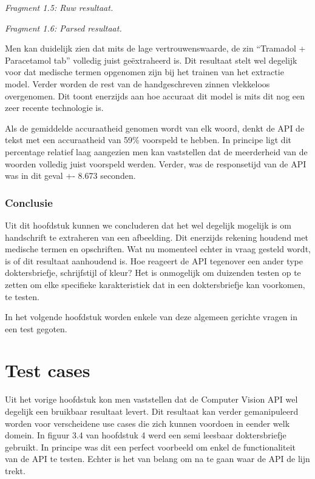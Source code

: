 
\textit{Fragment 1.5: Ruw resultaat.}
\newpage

\textit{Fragment 1.6: Parsed resultaat.}


Men kan duidelijk zien dat mits de lage vertrouwenswaarde, de zin “Tramadol + Paracetamol tab” volledig juist geëxtraheerd is. Dit resultaat stelt wel degelijk voor dat medische termen opgenomen zijn bij het trainen van het extractie model. Verder worden de rest van de handgeschreven zinnen vlekkeloos overgenomen. Dit toont enerzijds aan hoe accuraat dit model is mits dit nog een zeer recente technologie is.  


Als de gemiddelde accuraatheid genomen wordt van elk woord, denkt de API de tekst met een accuraatheid van 59\% voorspeld te hebben. In principe ligt dit percentage relatief laag aangezien men kan vaststellen dat de meerderheid van de woorden volledig juist voorspeld werden. Verder, was de responsetijd van de API was in dit geval +- 8.673 seconden. 

\subsection{Conclusie}
Uit dit hoofdstuk kunnen we concluderen dat het wel degelijk mogelijk is om handschrift te extraheren van een afbeelding. Dit enerzijds rekening houdend met medische termen en opschriften.  Wat nu momenteel echter in vraag gesteld wordt, is of dit resultaat aanhoudend is. Hoe reageert de API tegenover een ander type doktersbriefje, schrijfstijl of kleur? Het is onmogelijk om duizenden testen op te zetten om elke specifieke karakteristiek dat in een doktersbriefje kan voorkomen, te testen. 

In het volgende hoofdstuk worden enkele van deze algemeen gerichte vragen in een test gegoten. 
\chapter{Test cases}

Uit het vorige hoofdstuk kon men vaststellen dat de Computer Vision API wel degelijk een bruikbaar resultaat levert. Dit resultaat kan verder gemanipuleerd worden voor verscheidene use cases die zich kunnen voordoen in eender welk domein. In figuur 3.4 van hoofdstuk 4 werd een semi leesbaar doktersbriefje gebruikt. In principe was dit een perfect voorbeeld om enkel de functionaliteit van de API te testen. Echter is het van belang om na te gaan waar de API de lijn trekt.  




